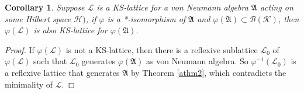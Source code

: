 \documentclass{amsart}
\newcommand{\AAA}{\mathfrak A}
\newcommand{\B}{\mathcal B}
\newcommand{\HHH}{\mathcal H} %
\newcommand{\KKK}{\mathcal K} %
\newcommand{\LLL}{\mathcal L} %
\newtheorem{corollary}{Corollary}[section]
\begin{document}
\begin{corollary}\label{acor3}
Suppose $\LLL$ is a KS-lattice for a von Neumann algebra $\AAA$ acting on some Hilbert space $\HHH)$, 
if $\varphi$ is a *-isomorphism of $\AAA$ and $\varphi(\AAA) \subset \B(\KKK)$,
then $\varphi(\LLL)$ is also KS-lattice for $\varphi(\AAA)$.
\end{corollary}

\begin{proof}
If $\varphi(\LLL)$ is not a KS-lattice, then there is a reflexive sublattice $\LLL_0$ of $\varphi(\LLL)$ such that $\LLL_0$ 
generates $\varphi(\AAA)$ as von Neumann algebra. So $\varphi^{-1}(\LLL_0)$ is a reflexive lattice that generates $\AAA$ 
by Theorem \ref{athm2}, which contradicts the minimality of  $\LLL$.
\end{proof}
\end{document}
